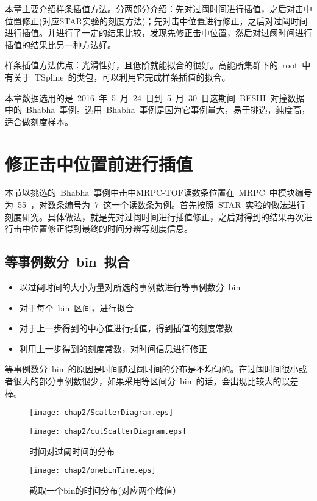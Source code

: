 本章主要介绍样条插值方法。分两部分介绍：先对过阈时间进行插值，之后对击中位置修正(对应STAR实验的刻度方法)；先对击中位置进行修正，之后对过阈时间进行插值。并进行了一定的结果比较，发现先修正击中位置，然后对过阈时间进行插值的结果比另一种方法好。

样条插值方法优点：光滑性好，且低阶就能拟合的很好。高能所集群下的~root~中有关于~TSpline~的类包，可以利用它完成样条插值的拟合。

本章数据选用的是~2016~年~5~月~24~日到~5~月~30~日这期间~BESIII~对撞数据中的~Bhabha~事例。选用~Bhabha~事例是因为它事例量大，易于挑选，纯度高，适合做刻度样本。

\section{修正击中位置前进行插值}

本节以挑选的~Bhabha~事例中击中MRPC-TOF读数条位置在~MRPC~中模块编号为~55~，对数条编号为~7~这一个读数条为例。首先按照~STAR~实验的做法进行刻度研究。具体做法，就是先对过阈时间进行插值修正，之后对得到的结果再次进行击中位置修正得到最终的时间分辨等刻度信息。
\subsection{等事例数分~bin~拟合}
\begin{itemize}
    \item 以过阈时间的大小为量对所选的事例数进行等事例数分~bin~
    \item 对于每个~bin~区间，进行拟合
    \item 对于上一步得到的中心值进行插值，得到插值的刻度常数
    \item 利用上一步得到的刻度常数，对时间信息进行修正 
\end{itemize}

等事例数分~bin~的原因是时间随过阈时间的分布是不均匀的。在过阈时间很小或者很大的部分事例数很少，如果采用等区间分~bin~的话，会出现比较大的误差棒。

\begin{figure}[htbp]
\begin{minipage}[t]{0.5\linewidth}
\texttt{[image: chap2/ScatterDiagram.eps]}
\label{fig:ScatterDiagram}
\end{minipage}%
\hfill
\begin{minipage}[t]{0.5\linewidth}
\texttt{[image: chap2/cutScatterDiagram.eps]}
\label{fig:cutScatterDiagram}
\end{minipage}
\caption{时间对过阈时间的分布}
\end{figure}
\begin{figure}[htbp]
\centering
\texttt{[image: chap2/onebinTime.eps]}
\caption{截取一个bin的时间分布(对应两个峰值）}
\label{fig:onebinTime}
\end{figure}


